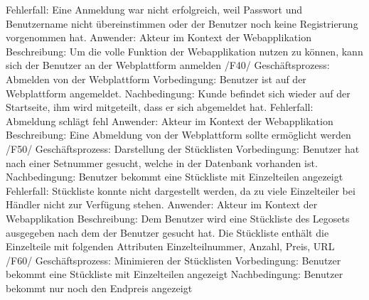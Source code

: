 Fehlerfall: Eine Anmeldung war nicht erfolgreich, weil Passwort und Benutzername nicht übereinstimmen oder der Benutzer noch keine Registrierung vorgenommen hat.\newline
Anwender: Akteur im Kontext der Webapplikation\newline
Beschreibung: Um die volle Funktion der Webapplikation nutzen zu können, kann sich der Benutzer an der Webplattform anmelden\newline\newline
/F40/ \newline
Geschäftsprozess: Abmelden von der Webplattform \newline
Vorbedingung: Benutzer ist auf der Webplattform angemeldet.\newline
Nachbedingung: Kunde befindet sich wieder auf der Startseite, ihm wird mitgeteilt, dass er sich abgemeldet hat. \newline
Fehlerfall: Abmeldung schlägt fehl \newline
Anwender: Akteur im Kontext der Webapplikation \newline 
Beschreibung: Eine Abmeldung von der Webplattform sollte ermöglicht werden \newline \newline
/F50/\newline
Geschäftsprozess: Darstellung der Stücklisten\newline
Vorbedingung: Benutzer hat nach einer Setnummer gesucht, welche in der Datenbank vorhanden ist.\newline
Nachbedingung: Benutzer bekommt eine Stückliste mit Einzelteilen angezeigt \newline
Fehlerfall: Stückliste konnte nicht dargestellt werden, da zu viele Einzelteiler bei Händler nicht zur Verfügung stehen. \newline
Anwender: Akteur im Kontext der Webapplikation \newline
Beschreibung: Dem Benutzer wird eine Stückliste des Legosets ausgegeben nach dem der Benutzer gesucht hat. Die Stückliste enthält die Einzelteile mit folgenden Attributen Einzelteilnummer, Anzahl, Preis, URL \newline\newline
/F60/\newline
Geschäftsprozess: Minimieren der Stücklisten\newline
Vorbedingung: Benutzer bekommt eine Stückliste mit Einzelteilen angezeigt\newline
Nachbedingung: Benutzer bekommt nur noch den Endpreis angezeigt\newline
